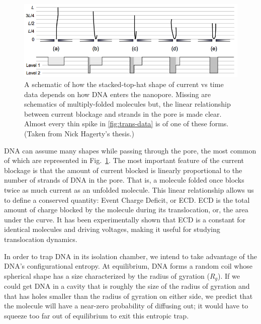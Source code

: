 \documentclass[aps,prl,preprint,groupedaddress]{revtex4}
\begin{document}
\begin{figure}[ht]
\centering
\includegraphics[width=1\textwidth]{figures/dna-approach}
\caption{A schematic of how the stacked-top-hat shape of current vs time data depends on how DNA enters the nanopore. Missing are schematics of multiply-folded molecules but, the linear relationship between current blockage and strands in the pore is made clear. Almost every thin spike in \ref{fig:trans-data} is of one of these forms. (Taken from Nick Hagerty's thesis.)}
\label{fig:dna-approach}
\end{figure}

DNA can assume many shapes while passing through the pore, the most common of which are represented in Fig.~\ref{fig:dna-approach}.
The most important feature of the current blockage is that the amount of current blocked is linearly proportional to the number of strands of DNA in the pore.
That is, a molecule folded once blocks twice as much current as an unfolded molecule.
This linear relationship allows us to define a conserved quantity: Event Charge Deficit, or ECD.
ECD is the total amount of charge blocked by the molecule during its translocation, or, the area under the curve.
It has been experimentally shown that ECD is a constant for identical molecules and driving voltages, making it useful for studying translocation dynamics.

In order to trap DNA in its isolation chamber, we intend to take advantage of the DNA’s configurational entropy.
At equilibrium, DNA forms a random coil whose spherical shape has a size characterized by the radius of gyration ($R_g$).
If we could get DNA in a cavity that is roughly the size of the radius of gyration and that has holes smaller than the radius of gyration on either side, we predict that the molecule will have a near-zero probability of diffusing out; it would have to squeeze too far out of equilibrium to exit this entropic trap.\cite{trapping}
\end{document}
